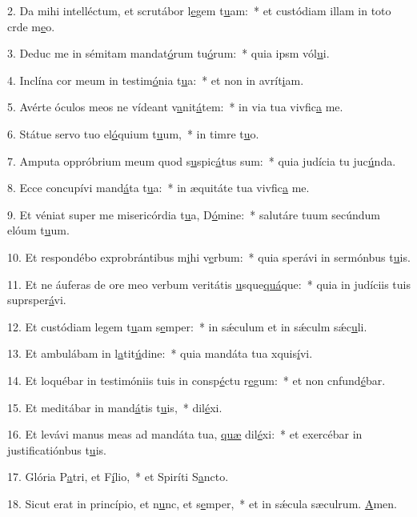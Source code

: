 2. Da mihi intelléctum, et scrutábor l\uline{e}gem t\uline{u}am:~* et custódiam illam in toto crde m\uline{e}o.\par 
3. Deduc me in sémitam mandat\uline{ó}rum tu\uline{ó}rum:~* quia ipsm vól\uline{u}i.\par 
4. Inclína cor meum in testim\uline{ó}nia t\uline{u}a:~* et non in avrít\uline{i}am.\par 
5. Avérte óculos meos ne vídeant v\uline{a}nit\uline{á}tem:~* in via tua vivfic\uline{a} me.\par 
6. Státue servo tuo el\uline{ó}quium t\uline{u}um,~* in timre t\uline{u}o.\par 
7. Amputa oppróbrium meum quod s\uline{u}spic\uline{á}tus sum:~* quia judícia tu juc\uline{ú}nda.\par 
8. Ecce concupívi mand\uline{á}ta t\uline{u}a:~* in æquitáte tua vivfic\uline{a} me.\par 
9. Et véniat super me misericórdia t\uline{u}a, D\uline{ó}mine:~* salutáre tuum secúndum elóum t\uline{u}um.\par 
10. Et respondébo exprobrántibus m\uline{i}hi v\uline{e}rbum:~* quia sperávi in sermónbus t\uline{u}is.\par 
11. Et ne áuferas de ore meo verbum veritátis \uline{u}sque\uline{quá}que:~* quia in judíciis tuis suprsper\uline{á}vi.\par 
12. Et custódiam legem t\uline{u}am s\uline{e}mper:~* in sǽculum et in sǽculm sǽc\uline{u}li.\par 
13. Et ambulábam in l\uline{a}tit\uline{ú}dine:~* quia mandáta tua xquis\uline{í}vi.\par 
14. Et loquébar in testimóniis tuis in consp\uline{é}ctu r\uline{e}gum:~* et non cnfund\uline{é}bar.\par 
15. Et meditábar in mand\uline{á}tis t\uline{u}is,~*  dil\uline{é}xi.\par 
16. Et levávi manus meas ad mandáta tua, \uline{quæ} dil\uline{é}xi:~* et exercébar in justificatiónbus t\uline{u}is.\par 
17. Glória P\uline{a}tri, et F\uline{í}lio,~* et Spiríti S\uline{a}ncto.\par 
18. Sicut erat in princípio, et n\uline{u}nc, et s\uline{e}mper,~* et in sǽcula sæculrum. \uline{A}men.\par 
